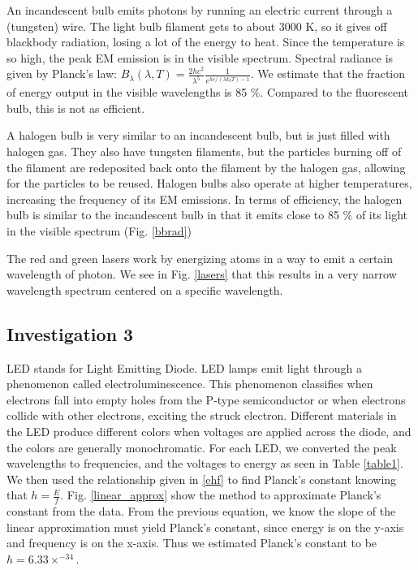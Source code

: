 \documentclass{article}[12pt]
\renewcommand{\figurename}{Fig. }
\begin{document}
An incandescent bulb emits photons by running an electric current through a (tungsten) wire.
The light bulb filament gets to about 3000 K, so it gives off blackbody radiation, losing a lot of the energy to heat.
Since the temperature is so high, the peak EM emission is in the visible spectrum. 
Spectral radiance is given by Planck's law: $ B_{\lambda}(\lambda,T) = \frac{2hc^2}{\lambda ^{5} } \frac{1}{e^{hc / (\lambda k_{b}T)-1} } $.
We estimate that the fraction of energy output in the visible wavelengths is 85 \%.
Compared to the fluorescent bulb, this is not as efficient.

A halogen bulb is very similar to an incandescent bulb, but is just filled with halogen gas.
They also have tungsten filaments, but the particles burning off of the filament are redeposited back onto the filament by the halogen gas, allowing for the particles to be reused.
Halogen bulbs also operate at higher temperatures, increasing the frequency of its EM emissions.
In terms of efficiency, the halogen bulb is similar to the incandescent bulb in that it emits close to 85 \% of its light in the visible spectrum (\figurename \ref{bbrad})

The red and green lasers work by energizing atoms in a way to emit a certain wavelength of photon. We see in \figurename \ref{lasers} that this results in a very narrow wavelength spectrum centered on a specific wavelength.

\subsection{Investigation 3}

LED stands for Light Emitting Diode.
LED lamps emit light through a phenomenon called electroluminescence.
This phenomenon classifies when electrons fall into empty holes from the P-type semiconductor or when electrons collide with other electrons, exciting the struck electron.
Different materials in the LED produce different colors when voltages are applied across the diode, and the colors are generally monochromatic.
For each LED, we converted the peak wavelengths to frequencies, and the voltages to energy as seen in Table \ref{table1}.
We then used the relationship given in \eqref{ehf} to find Planck's constant knowing that $ h=\frac{E}{f} $.
\figurename \ref{linear_approx} show the method to approximate Planck's constant from the data.
From the previous equation, we know the slope of the linear approximation must yield Planck's constant, since energy is on the y-axis and frequency is on the x-axis.
Thus we estimated Planck's constant to be $ h = 6.33 \times ^{-34}  $.
\end{document}
